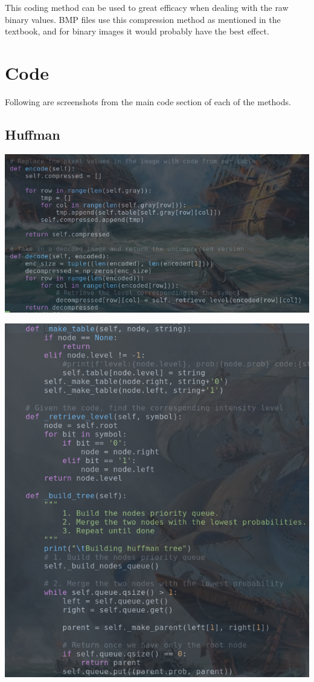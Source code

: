 \documentclass{article}
\begin{document}
This coding method can be used to great efficacy when dealing with the raw binary values. BMP files 
use this compression method as mentioned in the textbook, and for binary images it would probably have 
the best effect. 

\section{Code}
Following are screenshots from the main code section of each of the methods.
\subsection{Huffman}
\includegraphics[scale=.40]{huff1.png}


\includegraphics[scale=.40]{huff2.png}
\end{document}
